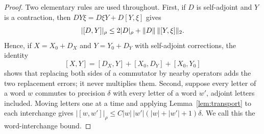 \begin{proof}
Two elementary rules are used throughout. First, if $D$ is self-adjoint and $Y$ is a contraction, then $DY\xi=D\xi Y+D[Y,\xi]$ gives
\begin{equation}\label{eq:comm-replace}
 |[D,Y]|_\rho\le2|D|_\rho+\lVert D\rVert\,\lVert[Y,\xi]\rVert_2.
\end{equation}
Hence, if $X=X_0+D_X$ and $Y=Y_0+D_Y$ with self-adjoint corrections, the identity
\[
 [X,Y]=[D_X,Y]+[X_0,D_Y]+[X_0,Y_0]
\]
shows that replacing both sides of a commutator by nearby operators adds the two replacement errors; it never multiplies them. Second, suppose every letter of a word $w$ commutes to precision $\delta$ with every letter of a word $w'$, adjoint letters included. Moving letters one at a time and applying Lemma~\ref{lem:transport} to each interchange gives $|[w,w']|_\rho\le C|w|\,|w'|(|w|+|w'|+1)\delta$. We call this the word-interchange bound.


\end{proof}
